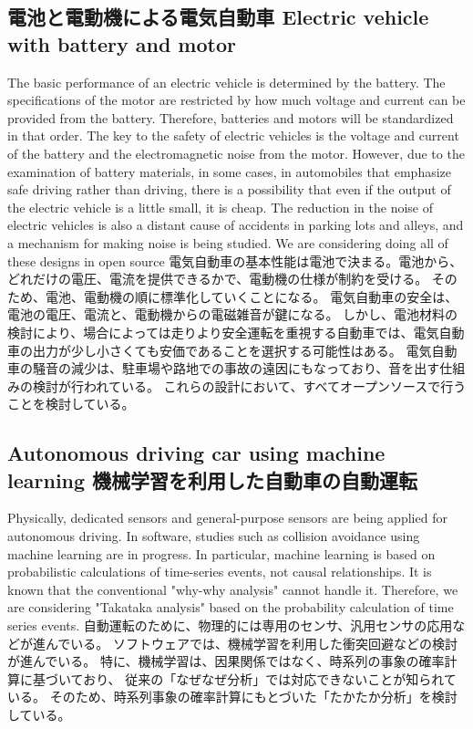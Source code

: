 \documentclass[twocolumn]{article} %
\begin{document}
\subsection{電池と電動機による電気自動車 Electric vehicle with battery and motor }
The basic performance of an electric vehicle is determined by the battery. The specifications of the motor are restricted by how much voltage and current can be provided from the battery.
Therefore, batteries and motors will be standardized in that order.
The key to the safety of electric vehicles is the voltage and current of the battery and the electromagnetic noise from the motor.
However, due to the examination of battery materials, in some cases, in automobiles that emphasize safe driving rather than driving, there is a possibility that even if the output of the electric vehicle is a little small, it is cheap.
The reduction in the noise of electric vehicles is also a distant cause of accidents in parking lots and alleys, and a mechanism for making noise is being studied.
We are considering doing all of these designs in open source
電気自動車の基本性能は電池で決まる。電池から、どれだけの電圧、電流を提供できるかで、電動機の仕様が制約を受ける。
そのため、電池、電動機の順に標準化していくことになる。
電気自動車の安全は、電池の電圧、電流と、電動機からの電磁雑音が鍵になる。
しかし、電池材料の検討により、場合によっては走りより安全運転を重視する自動車では、電気自動車の出力が少し小さくても安価であることを選択する可能性はある。
電気自動車の騒音の減少は、駐車場や路地での事故の遠因にもなっており、音を出す仕組みの検討が行われている。
これらの設計において、すべてオープンソースで行うことを検討している\cite{toppers2020}。

\subsection{Autonomous driving car using machine learning 機械学習を利用した自動車の自動運転 }
Physically, dedicated sensors and general-purpose sensors are being applied for autonomous driving.
In software, studies such as collision avoidance using machine learning are in progress.
In particular, machine learning is based on probabilistic calculations of time-series events, not causal relationships.
It is known that the conventional "why-why analysis" cannot handle it.
Therefore, we are considering "Takataka analysis" based on the probability calculation of time series events.
自動運転のために、物理的には専用のセンサ、汎用センサの応用などが進んでいる。
ソフトウェアでは、機械学習を利用した衝突回避などの検討が進んでいる。
特に、機械学習は、因果関係ではなく、時系列の事象の確率計算に基づいており、
従来の「なぜなぜ分析」では対応できないことが知られている。
そのため、時系列事象の確率計算にもとづいた「たかたか分析」を検討している\cite{takataka}。
\end{document}
